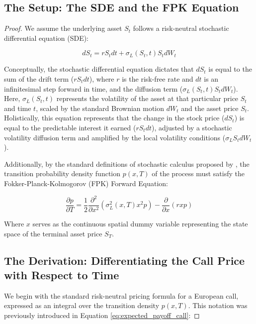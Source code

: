 \documentclass[12pt,oneside]{report}
\theoremstyle{definition}
\theoremstyle{remark}
\begin{document}
\subsection{The Setup: The SDE and the FPK Equation}
\begin{proof}
We assume the underlying asset $S_t$ follows a risk-neutral stochastic differential equation (SDE):

\begin{equation}
dS_t = r S_t dt + \sigma_L(S_t, t) S_t dW_t
\label{eq:sde}
\end{equation}

Conceptually, the stochastic differential equation dictates that $dS_t$ is equal to the sum of the drift term ($r S_t dt$), where $r$ is the risk-free rate and $dt$ is an infinitesimal step forward in time, and the diffusion term ($\sigma_L(S_t, t) S_t dW_t$). Here, $\sigma_L(S_t, t)$ represents the volatility of the asset at that particular price $S_t$ and time $t$, scaled by the standard Brownian motion $dW_t$ and the asset price $S_t$. Holistically, this equation represents that the change in the stock price ($dS_t$) is equal to the predictable interest it earned ($r S_t dt$), adjusted by a stochastic volatility diffusion term and amplified by the local volatility conditions ($\sigma_L S_t dW_t$). 

Additionally, by the standard definitions of stochastic calculus proposed by \citet{shreve2004stochastic}, the transition probability density function $p(x, T)$ of the process must satisfy the Fokker-Planck-Kolmogorov (FPK) Forward Equation:

\begin{equation}
\frac{\partial p}{\partial T} = \frac{1}{2} \frac{\partial^2}{\partial x^2} \left( \sigma_L^2(x, T) x^2 p \right) - \frac{\partial}{\partial x} (r x p)
\label{eq:fpk_equation}
\end{equation}

Where $x$ serves as the continuous spatial dummy variable representing the state space of the terminal asset price $S_T$.

\subsection{The Derivation: Differentiating the Call Price with Respect to Time}

We begin with the standard risk-neutral pricing formula for a European call, expressed as an integral over the transition density $p(x, T)$. This notation was previously introduced in Equation \ref{eq:expected_payoff_call}:


\end{proof}
\end{document}
